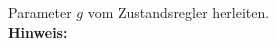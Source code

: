 \begin{question}[section=8,name={Zustandsregler},difficulty=,type=mdl,tags={}]
	Parameter $g$ vom Zustandsregler herleiten.
	\\ \textbf{Hinweis:}\\
	
\end{question}
\begin{solution}
	
\end{solution}